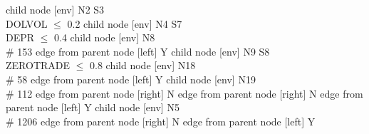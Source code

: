 
      child { node [env] {N2  S3 \\ DOLVOL $\leq$ 0.2} 
            child { node [env] {N4  S7 \\ DEPR $\leq$ 0.4} 
                  child { node [env] {N8   \\ \# 153 } 
                        edge from parent node [left] {Y} 
                  }
                  child { node [env] {N9  S8 \\ ZEROTRADE $\leq$ 0.8} 
                        child { node [env] {N18   \\ \# 58 } 
                              edge from parent node [left] {Y} 
                        }
                        child { node [env] {N19   \\ \# 112 } 
                              edge from parent node [right] {N} 
                        }
                        edge from parent node [right] {N} 
                  }
                  edge from parent node [left] {Y} 
            }
            child { node [env] {N5   \\ \# 1206 } 
                  edge from parent node [right] {N} 
            }
            edge from parent node [left] {Y} 
      }
